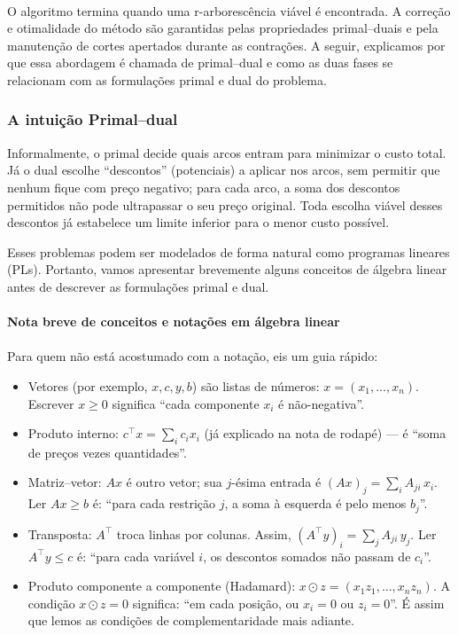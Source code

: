 \documentclass[12pt,a4paper]{article}
\def\emph#1{#1}%
\begin{document}
\paragraph{}
O algoritmo termina quando uma r-arborescência viável é encontrada. A correção e otimalidade do método são garantidas pelas propriedades primal–duais e pela manutenção de cortes apertados durante as contrações.
A seguir, explicamos por que essa abordagem é chamada de primal–dual e como as duas fases se relacionam com as formulações primal e dual do problema.

\subsubsection{A intuição Primal–dual}

Informalmente, o primal decide quais arcos entram para minimizar o custo total. Já o dual escolhe “descontos” (potenciais) a aplicar nos arcos, sem permitir que nenhum fique com preço negativo; para cada arco, a soma dos descontos permitidos não pode ultrapassar o seu preço original. Toda escolha viável desses descontos já estabelece um limite inferior para o menor custo possível.

Esses problemas podem ser modelados de forma natural como \emph{programas lineares} (PLs). Portanto, vamos apresentar brevemente alguns conceitos de álgebra linear antes de descrever as formulações primal e dual.

\paragraph{Nota breve de conceitos e notações em álgebra linear}

\paragraph{}
Para quem não está acostumado com a notação, eis um guia rápido:
\begin{itemize}\setlength{\itemsep}{1pt}
    \item Vetores (por exemplo, \(x, c, y, b\)) são listas de números: \(x=(x_1,\dots,x_n)\). Escrever \(x\ge 0\) significa “cada componente \(x_i\) é não-negativa”.
    \item Produto interno: \(c^\top x=\sum_i c_i x_i\) (já explicado na nota de rodapé) — é “soma de preços vezes quantidades”.
    \item Matriz–vetor: \(Ax\) é outro vetor; sua \(j\)-ésima entrada é \((Ax)_j=\sum_i A_{j i}\,x_i\). Ler \(Ax\ge b\) é: “para cada restrição \(j\), a soma à esquerda é pelo menos \(b_j\)”.
    \item Transposta: \(A^\top\) troca linhas por colunas. Assim, \((A^\top y)_i=\sum_j A_{j i}\,y_j\). Ler \(A^\top y\le c\) é: “para cada variável \(i\), os descontos somados não passam de \(c_i\)”.
    \item Produto componente a componente (Hadamard): \(x\odot z=(x_1 z_1,\dots,x_n z_n)\). A condição \(x\odot z=0\) significa: “em cada posição, ou \(x_i=0\) ou \(z_i=0\)”. É assim que lemos as condições de complementaridade mais adiante.
\end{itemize}
\end{document}
